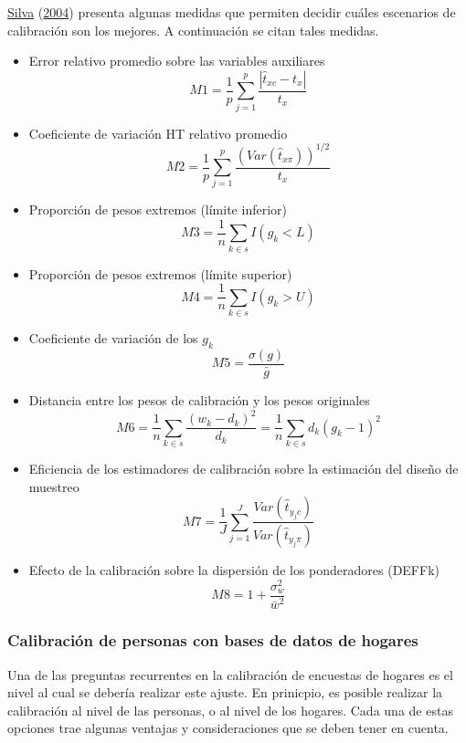 \documentclass[
  12pt,
  spanish,
]{book}
\begin{document}
\protect\hyperlink{ref-Silva_2004}{Silva} (\protect\hyperlink{ref-Silva_2004}{2004}) presenta algunas medidas que permiten decidir cuáles escenarios de calibración son los mejores. A continuación se citan tales medidas.

\begin{itemize}
\item
  Error relativo promedio sobre las variables auxiliares
  \[
  M1= \frac{1}{p} \sum_{j=1}^p \frac{|\hat{t}_{xc} - t_x|}{t_x}
  \]
\item
  Coeficiente de variación HT relativo promedio
  \[M2= \frac{1}{p} \sum_{j=1}^p \frac{(Var(\hat{t}_{x\pi}))^{1/2}}{t_x} \]
\item
  Proporción de pesos extremos (límite inferior)
  \[M3 = \frac{1}{n} \sum_{k \in s}I(g_k<L)\]
\item
  Proporción de pesos extremos (límite superior)
  \[M4= \frac{1}{n} \sum_{k \in s}I(g_k>U)\]
\item
  Coeficiente de variación de los \(g_k\)
  \[M5= \frac{\sigma(g)}{\bar{g}}\]
\item
  Distancia entre los pesos de calibración y los pesos originales
  \[M6 = \frac{1}{n}\sum_{k \in s} \frac{(w_k - d_k)^2}{d_k}
  = \frac{1}{n}\sum_{k \in s} d_k(g_k - 1)^2\]
\item
  Eficiencia de los estimadores de calibración sobre la estimación del diseño de muestreo
  \[M7 = \frac{1}{J}\sum_{j=1}^J \frac{Var(\hat{t}_{y_jc})}{Var(\hat{t}_{y_j\pi})} \]
\item
  Efecto de la calibración sobre la dispersión de los ponderadores (DEFFk)
  \[M8 = 1+\frac{\sigma^2_w}{\bar{w}^2}\]
\end{itemize}

\hypertarget{calibraciuxf3n-de-personas-con-bases-de-datos-de-hogares}{%
\subsubsection*{Calibración de personas con bases de datos de hogares}\label{calibraciuxf3n-de-personas-con-bases-de-datos-de-hogares}}

Una de las preguntas recurrentes en la calibración de encuestas de hogares es el nivel al cual se debería realizar este ajuste. En prinicpio, es posible realizar la calibración al nivel de las personas, o al nivel de los hogares. Cada una de estas opciones trae algunas ventajas y consideraciones que se deben tener en cuenta.
\end{document}
